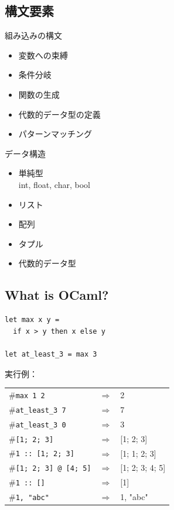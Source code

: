 \documentclass[papersize,30pt,slide]{jsarticle}
\begin{document}
\subsection{構文要素}
\begin{multicols}{2}

組み込みの構文 %
\begin{itemize}
\item 変数への束縛 
\item 条件分岐
\item 関数の生成
\item 代数的データ型の定義
\item パターンマッチング
\end{itemize} 

データ構造 
\begin{itemize}
\item 単純型 \\ int, float, char, bool
\item リスト
\item 配列
\item タプル
\item 代数的データ型
\end{itemize}
\end{multicols}

\newpage
\subsection{What is OCaml?}
\begin{lstlisting}
let max x y =
  if x > y then x else y

let at_least_3 = max 3
\end{lstlisting}
{
実行例：
\begin{tabular}{lcl}
\#\lstinline|max 1 2| &$\Longrightarrow$& 2\\
\#\lstinline|at_least_3 7| &$\Longrightarrow$& 7\\
\#\lstinline|at_least_3 0| &$\Longrightarrow$& 3\\
\#\lstinline|[1; 2; 3]| &$\Longrightarrow$& [1; 2; 3]\\
\#\lstinline|1 :: [1; 2; 3]| &$\Longrightarrow$& [1; 1; 2; 3]\\
\#\lstinline|[1; 2; 3] @ [4; 5]| &$\Longrightarrow$& [1; 2; 3; 4; 5]\\
\#\lstinline|1 :: []| &$\Longrightarrow$& [1]\\
\#\lstinline|1, "abc"| &$\Longrightarrow$& 1, "abc"\\
\end{tabular}

\newpage
}
\end{document}
